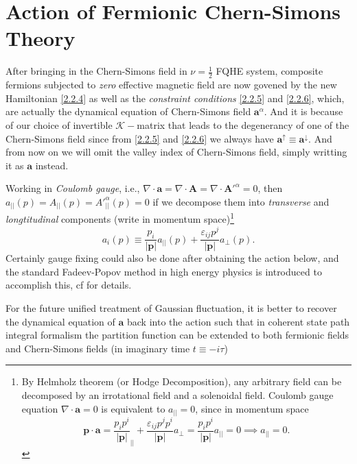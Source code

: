 \documentclass[bachelor,english,numbers]{ustcthesis}
\begin{document}
	\section{Action of Fermionic Chern-Simons Theory}
		\indent\par After bringing in the Chern-Simons field in $\nu=\frac{1}{2}$ FQHE system, composite fermions subjected to \emph{zero} effective magnetic field are now govened by the new Hamiltonian \eqref{2.2.4} as well as the \emph{constraint conditions} \eqref{2.2.5} and \eqref{2.2.6}, which, are actually the dynamical equation of Chern-Simons field $\bm{a}^\alpha$. And it is because of our choice of invertible $\mathcal{K}-$matrix that leads to the degenerancy of one of the Chern-Simons field  since from \eqref{2.2.5} and \eqref{2.2.6} we always have $\bm{a}^\uparrow\equiv \bm{a}^\downarrow$. And from now on we will omit the valley index of Chern-Simons field, simply writting it as $\bm{a}$ instead.\par
		Working in \emph{Coulomb gauge}, i.e., $\nabla\cdot \bm{a}=\nabla\cdot\bm{A}=\nabla\cdot\bm{A'}^\alpha=0$, then $a_{||}(p)=A_{||}(p)={A'}^\alpha_{||}(p)=0$ if we decompose them into \emph{transverse} and \emph{longtitudinal} components (write in momentum space)\footnote{By Helmholz theorem (or Hodge Decomposition), any arbitrary field can be decomposed by an irrotational field and a solenoidal field. Coulomb gauge equation $\nabla\cdot\bm{a}=0$ is equivalent to $a_{||}=0$, since in momentum space
		\begin{equation*}
			\bm{p}\cdot\bm{a}=\dfrac{p_i p^i}{|\bm{p}|}_{||}+\dfrac{\varepsilon_{ij}p^jp^i}{|\bm{p}|}a_{\perp}=\dfrac{p_i p^i}{|\bm{p}|}a_{||}=0\implies a_{||}=0.
		\end{equation*}}
		\begin{equation}\label{2.3.0}
			a_i(p)\equiv\dfrac{p_i}{|\bm{p}|}a_{||}(p)+\dfrac{\varepsilon_{ij}p^j}{|\bm{p}|} a_{\perp}(p).
		\end{equation}
		Certainly gauge fixing could also be done after obtaining the action below, and the standard Fadeev-Popov method in high energy physics is introduced to accomplish this, cf \cite{peskin1995introduction} for details.\par
		For the future unified treatment of Gaussian fluctuation, it is better to recover the dynamical equation of $\bm{a}$ back into the action such that in coherent state path integral formalism the partition function can be extended to both fermionic fields and Chern-Simons fields (in imaginary time $t\equiv-i\tau$)
\end{document}

